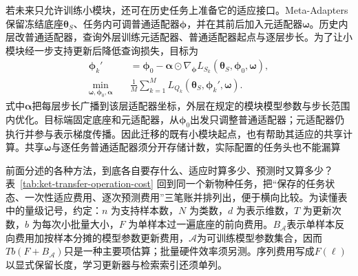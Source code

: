 若未来只允许训练小模块，还可在历史任务上准备它的适应接口。Meta-Adapters保留冻结底座$\bm\theta_S$、任务内可调普通适配器$\bm\phi$，并在其前后加入元适配器$\bm\omega$。历史内层改普通适配器，查询外层训练元适配器、普通适配器起点与逐层步长。为了让小模块经一步支持更新后降低查询损失，目标为
\begin{align}
  \bm\phi_k'
    &=\bm\phi_0-\bm\alpha\odot
       \nabla_{\bm\phi}L_{S_k}
         (\bm{\theta}_S,\bm\phi_0,\bm\omega), \nonumber\\
  \min_{\bm\omega,\bm\phi_0,\bm\alpha}\quad
  &\frac1M\sum_{k=1}^{M}
    L_{Q_k}(\bm{\theta}_S,\bm\phi_k',\bm\omega).
  \label{eq:ket-transfer-meta-adapters}
\end{align}
式中$\bm\alpha$把每层步长广播到该层适配器坐标，外层在规定的模块模型参数与步长范围内优化。目标端固定底座和元适配器，从$\bm\phi_0$出发只调整普通适配器；元适配器仍执行并参与表示梯度传播。因此迁移的既有小模块起点，也有帮助其适应的共享计算。共享$\bm\omega$与逐任务普通适配器须分开存储计数，实际配置的任务头也不能漏算

前面分述的各种方法，到底各自要存什么、适应时算多少、预测时又算多少？表~\ref{tab:ket-transfer-operation-cost} 回到同一个新物种任务，把“保存的任务状态、一次性适应费用、逐次预测费用”三笔账并排列出，便于横向比较。为读懂表中的量级记号，约定：$n$ 为支持样本数，$N$ 为类数，$d$ 为表示维数，$T$ 为更新次数，$b$ 为每次小批量大小，$F$ 为单样本过一遍底座的前向费用。$B_{\mathcal A}$表示单样本反向费用加按样本分摊的模型参数更新费用，$\mathcal A$为可训练模型参数集合，因而$Tb(F+B_{\mathcal A})$只是一种主要项估算；批量硬件效率须另测。序列费用写成$F(\ell)$以显式保留长度，学习更新器与检索索引还须单列。

